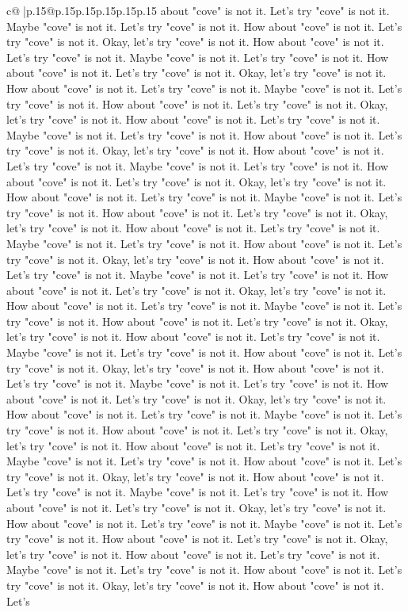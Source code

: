\documentclass{article}
\begin{document}
{\begin{supertabular}{c@{$\;$}|p{.15\linewidth}@{}p{.15\linewidth}p{.15\linewidth}p{.15\linewidth}p{.15\linewidth}p{.15\linewidth}}
{{{about "cove" is not it. Let's try "cove" is not it. Maybe "cove" is not it. Let's try "cove" is not it. How about "cove" is not it. Let's try "cove" is not it. Okay, let's try "cove" is not it. How about "cove" is not it. Let's try "cove" is not it. Maybe "cove" is not it. Let's try "cove" is not it. How about "cove" is not it. Let's try "cove" is not it. Okay, let's try "cove" is not it. How about "cove" is not it. Let's try "cove" is not it. Maybe "cove" is not it. Let's try "cove" is not it. How about "cove" is not it. Let's try "cove" is not it. Okay, let's try "cove" is not it. How about "cove" is not it. Let's try "cove" is not it. Maybe "cove" is not it. Let's try "cove" is not it. How about "cove" is not it. Let's try "cove" is not it. Okay, let's try "cove" is not it. How about "cove" is not it. Let's try "cove" is not it. Maybe "cove" is not it. Let's try "cove" is not it. How about "cove" is not it. Let's try "cove" is not it. Okay, let's try "cove" is not it. How about "cove" is not it. Let's try "cove" is not it. Maybe "cove" is not it. Let's try "cove" is not it. How about "cove" is not it. Let's try "cove" is not it. Okay, let's try "cove" is not it. How about "cove" is not it. Let's try "cove" is not it. Maybe "cove" is not it. Let's try "cove" is not it. How about "cove" is not it. Let's try "cove" is not it. Okay, let's try "cove" is not it. How about "cove" is not it. Let's try "cove" is not it. Maybe "cove" is not it. Let's try "cove" is not it. How about "cove" is not it. Let's try "cove" is not it. Okay, let's try "cove" is not it. How about "cove" is not it. Let's try "cove" is not it. Maybe "cove" is not it. Let's try "cove" is not it. How about "cove" is not it. Let's try "cove" is not it. Okay, let's try "cove" is not it. How about "cove" is not it. Let's try "cove" is not it. Maybe "cove" is not it. Let's try "cove" is not it. How about "cove" is not it. Let's try "cove" is not it. Okay, let's try "cove" is not it. How about "cove" is not it. Let's try "cove" is not it. Maybe "cove" is not it. Let's try "cove" is not it. How about "cove" is not it. Let's try "cove" is not it. Okay, let's try "cove" is not it. How about "cove" is not it. Let's try "cove" is not it. Maybe "cove" is not it. Let's try "cove" is not it. How about "cove" is not it. Let's try "cove" is not it. Okay, let's try "cove" is not it. How about "cove" is not it. Let's try "cove" is not it. Maybe "cove" is not it. Let's try "cove" is not it. How about "cove" is not it. Let's try "cove" is not it. Okay, let's try "cove" is not it. How about "cove" is not it. Let's try "cove" is not it. Maybe "cove" is not it. Let's try "cove" is not it. How about "cove" is not it. Let's try "cove" is not it. Okay, let's try "cove" is not it. How about "cove" is not it. Let's try "cove" is not it. Maybe "cove" is not it. Let's try "cove" is not it. How about "cove" is not it. Let's try "cove" is not it. Okay, let's try "cove" is not it. How about "cove" is not it. Let's try "cove" is not it. Maybe "cove" is not it. Let's try "cove" is not it. How about "cove" is not it. Let's try "cove" is not it. Okay, let's try "cove" is not it. How about "cove" is not it. Let's }}}
\end{supertabular}}
\end{document}
